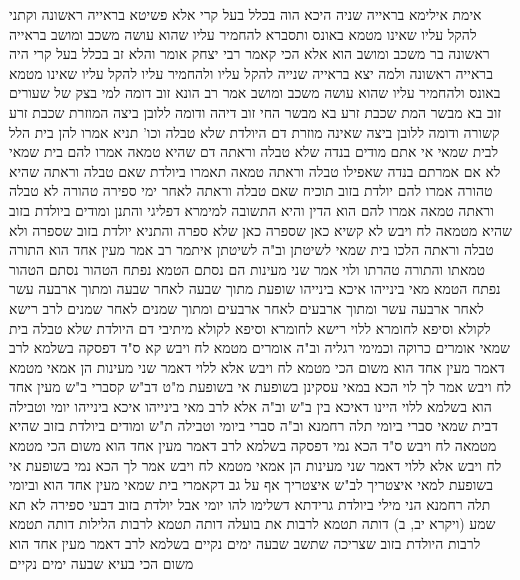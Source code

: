 \documentclass[12pt, openany]{book}
\begin{document}
{אימת  אילימא בראייה שניה היכא הוה בכלל בעל קרי  אלא פשיטא בראייה ראשונה וקתני להקל עליו שאינו מטמא באונס 
ותסברא להחמיר עליו שהוא עושה משכב ומושב בראייה ראשונה בר משכב ומושב הוא 
אלא הכי קאמר רבי יצחק אומר  והלא זב בכלל בעל קרי היה בראייה ראשונה ולמה יצא בראייה שנייה להקל עליו ולהחמיר עליו להקל עליו שאינו מטמא באונס ולהחמיר עליו שהוא עושה משכב ומושב 
אמר רב הונא  זוב דומה למי בצק של שעורים זוב בא מבשר המת שכבת זרע בא מבשר החי  זוב דיהה ודומה ללובן ביצה המוזרת שכבת זרע קשורה ודומה ללובן ביצה שאינה מוזרת
דם היולדת שלא טבלה וכו'
תניא אמרו להן בית הלל לבית שמאי  אי אתם מודים בנדה שלא טבלה וראתה דם שהיא טמאה  אמרו להם בית שמאי  לא אם אמרתם בנדה שאפילו טבלה וראתה טמאה  תאמרו ביולדת שאם טבלה וראתה שהיא טהורה 
אמרו להם  יולדת בזוב תוכיח שאם טבלה וראתה לאחר ימי ספירה טהורה לא טבלה וראתה טמאה 
אמרו להם  הוא הדין והיא התשובה 
למימרא דפליגי  והתנן  ומודים ביולדת בזוב שהיא מטמאה לח ויבש 
לא קשיא כאן שספרה כאן שלא ספרה 
והתניא  יולדת בזוב שספרה ולא טבלה וראתה הלכו בית שמאי לשיטתן וב"ה לשיטתן 
איתמר רב אמר  מעין אחד הוא התורה טמאתו והתורה טהרתו 
ולוי אמר  שני מעינות הם נסתם הטמא נפתח הטהור נסתם הטהור נפתח הטמא 
מאי בינייהו  איכא בינייהו  שופעת מתוך שבעה לאחר שבעה ומתוך ארבעה עשר לאחר ארבעה עשר ומתוך ארבעים לאחר ארבעים ומתוך שמנים לאחר שמנים
לרב רישא לקולא וסיפא לחומרא
ללוי רישא לחומרא וסיפא לקולא 
מיתיבי דם היולדת שלא טבלה בית שמאי אומרים  כרוקה וכמימי רגליה וב"ה אומרים  מטמא לח ויבש 
קא ס"ד דפסקה בשלמא לרב דאמר מעין אחד הוא משום הכי מטמא לח ויבש אלא ללוי דאמר שני מעינות הן אמאי מטמא לח ויבש 
אמר לך לוי  הכא במאי עסקינן בשופעת אי בשופעת  מ"ט דב"ש  קסברי ב"ש  מעין אחד הוא 
בשלמא ללוי היינו דאיכא בין ב"ש וב"ה אלא לרב מאי בינייהו 
איכא בינייהו יומי וטבילה דבית שמאי סברי ביומי תלה רחמנא וב"ה סברי ביומי וטבילה 
ת"ש  ומודים ביולדת בזוב שהיא מטמאה לח ויבש  ס"ד הכא נמי דפסקה
בשלמא לרב דאמר מעין אחד הוא משום הכי מטמא לח ויבש אלא ללוי דאמר שני מעינות הן אמאי מטמא לח ויבש 
אמר לך  הכא נמי בשופעת  אי בשופעת למאי איצטריך 
לב"ש איצטריך אף על גב דקאמרי בית שמאי מעין אחד הוא וביומי תלה רחמנא הני מילי ביולדת גרידתא דשלימו להו יומי אבל יולדת בזוב דבעי ספירה  לא 
תא שמע  (ויקרא יב, ב) דותה תטמא לרבות את בועלה
דותה תטמא לרבות הלילות דותה תטמא לרבות היולדת בזוב שצריכה שתשב שבעה ימים נקיים  בשלמא לרב דאמר מעין אחד הוא משום הכי בעיא שבעה ימים נקיים}
\end{document}
